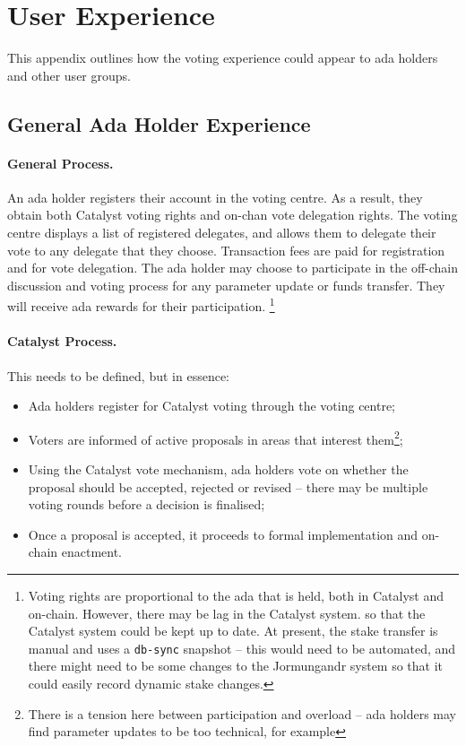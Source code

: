 \pagebreak
\section{User Experience}
\label{sect:ux}

This appendix outlines how the voting experience could appear to ada holders and other user groups.

\subsection{General Ada Holder Experience}

\paragraph{General Process.} An ada holder registers their account in the voting centre.  As a result, they obtain both Catalyst voting rights and on-chan vote delegation rights.
The voting centre displays a list of registered delegates, and allows them to delegate their vote to any delegate that they choose.  Transaction
fees are paid for registration and for vote delegation.  The ada holder may choose to participate in the off-chain discussion and voting process for any
parameter update or funds transfer. They will receive ada rewards for their participation.
\footnote{Voting rights are proportional to the ada that is held, both in Catalyst and on-chain.  However, there may be lag in the Catalyst system.
  so that the Catalyst system could be kept up to date.  At present, the stake transfer is manual and uses a \texttt{db-sync} snapshot -- this would need to be automated, and there might need to be some changes to the Jormungandr system
  so that it could easily record dynamic stake changes.  } %

\paragraph{Catalyst Process.}

This needs to be defined, but in essence:

\begin{itemize}
\item
  Ada holders register for Catalyst voting through the voting centre;
\item
  Voters are informed of active proposals in areas that interest them\footnote{There is a tension here between participation and overload -- ada holders may find parameter updates to be too technical, for example};
\item
  Using the Catalyst vote mechanism, ada holders vote on whether the proposal should be accepted, rejected or revised -- there may be multiple voting rounds
  before a decision is finalised;
\item
  Once a proposal is accepted, it proceeds to formal implementation and on-chain enactment.
\end{itemize}

